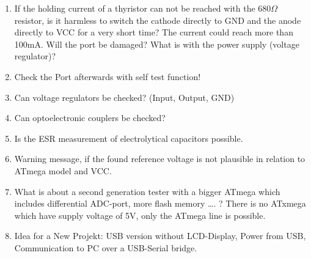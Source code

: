 \begin{enumerate}
\item If the holding current of a thyristor can not be reached with the \(680\Omega\) resistor, is it harmless to switch the cathode directly to GND
and the anode directly to VCC for a very short time?
The current could reach more than 100mA. Will the port be damaged? What is with the power supply (voltage regulator)?
\item Check the Port afterwards with self test function!
\item Can voltage regulators be checked? (Input, Output, GND)
\item Can optoelectronic couplers be checked?  
\item Is the ESR measurement of electrolytical capacitors  possible.
\item Warning message, if the found reference voltage is not plausible in relation to ATmega model and VCC.
\item What is about a second generation tester with a bigger ATmega which includes differential ADC-port, more flash memory …. ?
There is no ATxmega which have supply voltage of 5V, only the ATmega line  is possible. 
\item Idea for a New Projekt: USB  version without LCD-Display, Power from USB, Communication to PC over a USB-Serial bridge.
\end{enumerate}
